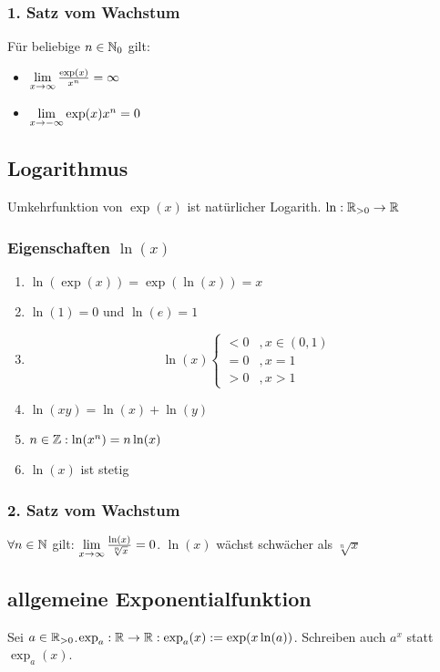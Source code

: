 \subsubsection*{1. Satz vom Wachstum}
Für beliebige $n \in \mathbb N_{0}$ gilt:
\begin{itemize}[noitemsep]
    \item $\lim\limits_{x \rightarrow \infty} \frac{\exp(x)}{x^n} = \infty$
    \item $\lim\limits_{x \rightarrow - \infty} \exp(x) x^n = 0$
\end{itemize}
\subsection*{Logarithmus}
Umkehrfunktion von $\exp(x)$ ist natürlicher Logarith. $\ln: \mathbb R_{>0} \rightarrow \mathbb R$
\subsubsection*{Eigenschaften \texorpdfstring{$\ln(x)$}{des Logarithmus}}
\begin{enumerate}[label=\alph*., noitemsep]
    \item $\ln(\exp(x)) = \exp(\ln(x)) = x$
    \item $\ln(1) = 0$ und $\ln(e) = 1$
    \item \[\ln(x) \begin{cases}
    < 0 &, x \in (0, 1)\\
    = 0 &, x = 1\\
    > 0 &, x > 1
    \end{cases}\]
    \item $\ln(xy) = \ln(x) + \ln(y)$
    \item $n \in \mathbb Z: \ln(x^n) = n \ln(x)$
    \item $\ln(x)$ ist stetig
\end{enumerate}
\subsubsection*{2. Satz vom Wachstum}
$\forall n \in \mathbb N$ gilt: $\lim\limits_{x \rightarrow \infty} \frac{\ln(x)}{\sqrt[n]{x}} = 0$. $\ln(x)$ wächst schwächer als $\sqrt[n]{x}$
\subsection*{allgemeine Exponentialfunktion}
Sei $a \in \mathbb R_{> 0}$.$\exp_a: \mathbb R\rightarrow \mathbb R: \exp_a(x) := \exp(x \ln(a))$. Schreiben auch $a^x$ statt $\exp_a(x)$.
